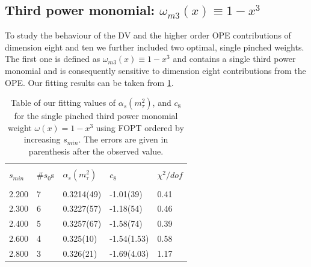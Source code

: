 \documentclass[../../index.tex]{subfiles}
\begin{document}
\subsection{Third power monomial: $\omega_{m3}(x) \equiv 1-x^3$}
To study the behaviour of the \textsc{DV} and the higher order \textsc{OPE}
contributions of dimension eight and ten we further included two optimal, single pinched weights.
The first one is defined as $\omega_{m3}(x)\equiv 1-x^3$ and contains a
single third power monomial and is consequently sensitive to dimension eight
contributions from the \textsc{OPE}. Our fitting results can be taken from
\cref{table:fitWM3AlD8}.
\begin{table}
  \centering
  \begin{tabular}{lllll}
    \toprule \\
    $s_{min}$ & \#$s_0$s & $\alpha_s(m_\tau^2)$ & $c_8$ &  $\chi^2/dof$  \\
    \hline \\
    2.200 & 7  & 0.3214(49) & -1.01(39) & 0.41 \\
    2.300 & 6  & 0.3227(57) & -1.18(54) & 0.46 \\
    2.400 & 5  & 0.3257(67) & -1.58(74) & 0.39 \\
    2.600 & 4  & 0.325(10) & -1.54(1.53) & 0.58 \\
    2.800 & 3  & 0.326(21) & -1.69(4.03) & 1.17 \\
    \bottomrule
  \end{tabular}
  \caption{Table of our fitting values of $\alpha_s(m_\tau^2)$, and
    $c_{8}$ for the single pinched third power monomial weight $\omega(x)=1-x^3$ using FOPT ordered
    by increasing $s_{min}$. The errors are given in parenthesis after the observed value.}
  \label{table:fitWM3AlD8}
\end{table}
\end{document}
